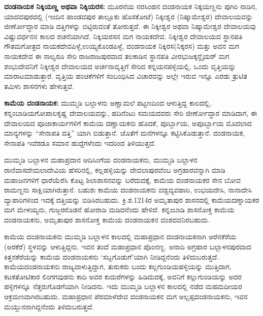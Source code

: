 \textbf{ದಂಡನಾಯಕ ನಿಕ್ಕಿಯಣ್ಣ ಅಥವಾ ನಿಕ್ಕಿಯರಸ:} ಮೂರನೆಯ ನರಸಿಂಹನ ದಂಡನಾಯಕ ನಿಕ್ಕಯಣ್ಣನು ಪುಗಿರಿ ನಾಡಿನ, ಯಾದವಪುರದಲ್ಲಿ (ಇಂದಿನ ಪಾಂಡವಪುರ ತಾಲ್ಲೂಕು ಹೊಸಕೋಟೆ) ನಿಕ್ಕೀಶ್ವರ (ನಿಷ್ಕಾಮೇಶ್ವರ) ದೇವಾಲಯವನ್ನು ಜೀರ್ಣೋದ್ಧಾರ ಮಾಡಿ ದತ್ತಿಗಳನ್ನು ಬಿಟ್ಟಿರುವಂತೆ ತೋರುತ್ತದೆ. ಈ ನಿಕ್ಕೀಶ್ವರ ಅಥವಾ ನಿಷ್ಕಾಮೇಶ್ವರ ದೇವಾಲಯವು ವಿಷ್ಣುವರ್ಧನನ ಕಾಲದ ರಚನೆಯಾಗಿದೆ. ನಿಕ್ಕಿಯರಸನ ಮಗ ನಾಯಕದೇವ. ನಿಕ್ಕೀಶ್ವರ ದೇವಾಲಯದ ಸ್ಥಾನಪತಿ ಗೌತಮಗೋತ್ರದ ನಾಯಕದೇವಪಿಳ್ಳೆ,\break ಉಯ್ಯಕೊಂಡಪಿಳ್ಳೆ, ದಂಡನಾಯಕ ನಿಕ್ಕಿರಸ(ನಿಕ್ಕರಸ) ಮತ್ತು ಅವನ ಮಗ ನಾಯಕದೇವ ಈ ನಾಲ್ವರೂ ಸೇರಿ ರಾಜರಾಜಪುರ\-ವಾದ ತಲಕಾಡಿನ ಸ್ಥಾನಪತಿ ವೀರಭುಜಕ್ಕನ್ದೈಯರ್​ ಮಗ ಶಂಭುದೇವನಿಗೆ ನಿಕ್ಕೀಶ್ವರ ದೇವಾಲಯದ ಅರ್ಚನಾವೃತ್ತಿಗೆ ಸೇರಿದ ಕನ್ನಯನಪಳ್ಳಿಯಲ್ಲಿ, ಒಂದು ವೃತ್ತಿಯನ್ನು ಮಾರಾಟಮಾಡುತ್ತಾರೆ. ವೃತ್ತಿಯ ಹಂಚಿಕೆಗಳಿಗೆ ಸಂಬಂಧಿಸಿದ ವಿಚಾರವನ್ನು ಅಲ್ಲೇ ಇರುವ ಇನ್ನೂ ಎರಡು ತ್ರುಟಿತ ತಮಿಳು ಶಾಸನಗಳು ಹೇಳುತ್ತವೆ.

\vskip 4pt

\textbf{ಕಾಮೆಯ ದಂಡನಾಯಕ:} ಮುಮ್ಮಡಿ ಬಲ್ಲಾಳನು ಅಣ್ಣಾಮಲೆ ಪಟ್ಟಣದಿಂದ ಆಳುತ್ತಿದ್ದ ಕಾಲದಲ್ಲಿ, ಕನ್ನಂಬಾಡಿಯ\break ಗೋಪಾಲಕೃಷ್ಣ ದೇವಾಲಯವನ್ನು, ಹದಿನೆಂಟು ಸಮಯದವರು ಸೇರಿ ಜೀರ್ಣೋದ್ಧಾರ ಮಾಡಿದಾಗ, ಈ ದೇವಾಲಯದ ಪೂಜಾಕಾರ್ಯಗಳಿಗೆ ಕಾಮೆಯ ದಣ್ಣಾಯಕನು ಹೊದಕೆ, ಪೂರ್ಬ್ಬಾಯ, ಅಪೂರ್ಬ್ಬಾಯ ಮೊದಲಾದ ಮಾನ್ಯಗಳನ್ನು “ಸೇನಾಪತಿ ದತ್ತಿ” ಯಾಗಿ ಬಿಡುತ್ತಾನೆ. ಜೊತೆಗೆ ಮನೆಗಳನ್ನೂ ಕಟ್ಟಿಸಿಕೊಡುತ್ತಾನೆ. ದಂಡನಾಯಕ, ಸೇನಾಪತಿ ಇವೆರಡೂ ಸಮಾನ ಹುದ್ದೆಗಳೆಂದು ಇದರಿಂದ ತಿಳಿಯುತ್ತದೆ.

\vskip 4pt

ಮುಮ್ಮಡಿ ಬಲ್ಲಾಳನ ಮಹಾಪ್ರದಾನ ಆದಿಸಿಂಗೆಯ ದಂಡನಾಯಕನು, ಮುಮ್ಮಡಿ ಬಲ್ಲಾಳನ ರಾಣಿವಾಸ\break ದೇಮಲಾದೇವಿಯ ಹೆಸರಿನಲ್ಲಿ, ಕಲ್ಲಹಳ್ಳಿಯನ್ನು ದೇವಲಾಪುರವೆಂಬ ಅಗ್ರಹಾರವನ್ನಾಗಿ ಮಾಡಿ ಮಹಾಜನಗಳಿಗೆ ಧಾರೆಯೆರೆಸಿ ಕೊಟ್ಟ ಶಿಲಾಶಾಸನವನ್ನು ಬರೆದುದಕ್ಕೆ, ಕಾಮೆಯ ದಂಡನಾಯಕರ ಸೇನ ಬೋವ ರಾಮಣ್ಣನು ಸಾಕ್ಷಿಯಾಗಿರುತ್ತಾನೆ. ಬಹುಶಃ ಕಾಮೆಯ ದಂಡನಾಯಕನು ವಡ್ಡವ್ಯವಹಾರಿ, ಉಭಯದೇಸಿ, ನಾನಾದೇಸಿ ವ್ಯಾಪಾರಿಗಳಿಂದ ಇದಕ್ಕೆ ದತ್ತಿಯನ್ನು ಬಿಡಿಸಿರಬಹುದು. ಕ್ರಿ.ಶ.1214ರ ಅಮೃತಾಪುರ ಶಾಸನದಲ್ಲಿ ಕಾಮೆಯದಣ್ನಾಯಕರ ಮಗ ಮೇಳಯ್ಯನು, ಗುಜ್ಜರರೊಡನೆ ಹೋರಾಡಿ ಮಡಿದನೆಂದು ಹೇಳಿದೆ. ಕನ್ನಂಬಾಡಿ ಶಾಸನೋಕ್ತ ಕಾಮೆಯ ದಂಡನಾಯಕನು, ಅಮೃತಾಪುರ ಶಾಸನೋಕ್ತ ಕಾಮೆಯ ದಂಡನಾಯಕನ ವಂಶದವನಿರಬಹುದು.

\vskip 4pt

ಕಾಮೆಯ ದಂಡನಾಯಕನು ಮುಮ್ಮಡಿ ಬಲ್ಲಾಳನ ಕಾಲದಲ್ಲಿ ಮಹಾಪ್ರಧಾನ ದಂಡನಾಯಕನಾಗಿ ಅರೆನಕೆರೆಯ (ಅರಕೆರೆ) ಸ್ಥಳವನ್ನು ಆಳುತ್ತಿದ್ದನು. ಇವನ ತಂದೆ ಮಹಾಪ್ರಧಾನ ಪೊಂನಣ್ಣ. ಅನಾದಿ ಅಗ್ರಹಾರ ಬಲ್ಲಾಳನಪುರವಾದ ಕಿತ್ತನಕೆರೆಯನ್ನು ಕಾಮೆಯ ದಂಡನಾಯಕನು ‘ಸಬ್ಬಗೊಡುಗೆ’ಯಾಗಿ ನೀಡಿದ್ದನೆಂದು ತಿಳಿದುಬರುತ್ತದೆ. ಕಾಮೆಯದಂಡನಾಯಕನು ರಾಜ್ಯವಾಳುತ್ತಿದ್ದಾಗ, ತುರುಕರು ಬಂದು ಕಲ್ಲಗುಂಡಿಯಹಳ್ಳಿಯನ್ನು ಮುತ್ತಿದಾಗ, ಕಟಕತೋಟಿಕಾರ ಲಿಂಗಗವುಡನು ಕಾದಿ ಅವರ ಕುದುರೆಗಳನ್ನು ಹಿಡಿದುದಕ್ಕೆ, ಅವನಿಗೆ ಕಲ್ಲುಗುಂಡಿಯನ್ನು ಅದರ ಹಳ್ಳಿಗಳನ್ನೂ ನೆತ್ತರುಗೊಡಗೆಯಾಗಿ ನೀಡಿದನು. ಇದು ಮುಮ್ಮಡಿ ಬಲ್ಲಾಳನ ಕಾಲದಲ್ಲಿ ನಡೆದ ಮಹಮದೀಯರ ಆಕ್ರಮಣವಾಗಿರಬಹುದು. ಮಹಾಪ್ರಧಾನ ಪೆರಮಾಳೆದೇವ ದಂಡನಾಯಕನ ಮಗ ಅಲ್ಲಪ್ಪದಂಡನಾಯಕನು, ಇವನ ಮಯ್ದುನನಾಗಿದ್ದನೆಂದು ತಿಳಿದುಬರುತ್ತದೆ.


